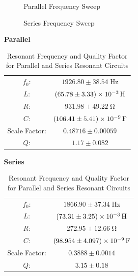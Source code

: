 \documentclass[12pt]{article}
\numberwithin{equation}{section}
\numberwithin{figure}{section}
\begin{document}
    \begin{figure}[H]
        \begin{center}
           \caption{Parallel Frequency Sweep}
           \label{fig:Parallel Frequency Sweep}
        \end{center}
    \end{figure}
    \begin{figure}[H]
        \begin{center}
           \caption{Series Frequency Sweep}
           \label{fig:Series Frequency Sweep}
        \end{center}
    \end{figure}

    \begin{table}[H]
        \begin{minipage}{0.5\textwidth}
            \centering
            \textbf{Parallel} \\
            \begin{tabular}{c c}
                \hline
                $f_0$: & $1926.80\pm38.54\; \si{\hertz}$\\
                $L$: & $\SI{65.78\pm3.33e-3}{\henry}$\\
                $R$: & $931.98\pm49.22\;\si{\ohm}$\\
                $C$: & $\SI{106.41\pm5.41e-09}{\farad}$\\
                Scale Factor: & $0.48716\pm0.00059$\\
                $Q$: & $1.17\pm0.082$
            \end{tabular}
        \end{minipage}
        \vline\;
        \begin{minipage}{0.5\textwidth}
            \centering
            \textbf{Series} \\
            \begin{tabular}{c c}
                \hline
                $f_0$: & $1866.90\pm37.34\; \si{\hertz}$\\
                $L$: & $\SI{73.31\pm3.25e-3}{\henry}$\\
                $R$: & $272.95\pm12.66\;\si{\ohm}$\\
                $C$: & $\SI{98.954\pm4.097e-09}{\farad}$\\
                Scale Factor: & $ 0.3888\pm0.0014$\\
                $Q$: & $3.15\pm0.18$
            \end{tabular}
        \end{minipage}
        \caption{Resonant Frequency and Quality Factor for Parallel and Series Resonant Circuits}
        \label{tbl:Resonant Frequency and Quality Factor}
    \end{table}
\end{document}
